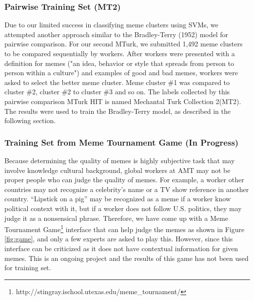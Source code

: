 \documentclass{sig-alternate}
\begin{document}
\subsubsection{Pairwise Training Set (MT2)}
Due to our limited success in classifying meme clusters using SVMs, we attempted another approach similar to the Bradley-Terry (1952) model for pairwise comparison.  For our second MTurk, we submitted 1,492 meme clusters to be compared sequentially by workers. After workers were presented with a definition for memes ("an idea, behavior or style that spreads from person to person within a culture") and examples of good and bad memes, workers were asked to select the better meme cluster. Meme cluster \#1 was compared to cluster \#2, cluster \#2 to cluster \#3 and so on. The labels collected by this pairwise comparison MTurk HIT is named Mechantal Turk Collection 2(MT2). The results were used to train the Bradley-Terry model, as described in the following section. 


\subsubsection{Training Set from Meme Tournament Game (In Progress)}

Because determining the quality of memes is highly subjective task that may involve knowledge cultural background, global workers at AMT may not be proper people who can judge the quality of memes. For example, a worker other countries may not recognize a celebrity's name or a TV show reference in another country. ``Lipstick on a pig'' may be recognized as a meme if a worker know political context with it, but if a worker does not follow U.S. politics, they may judge it as a nonsensical phrase. Therefore, we have come up with a Meme Tournament Game\footnote{http://stingray.ischool.utexas.edu/meme\_tournament/} interface that can help judge the memes as shown in Figure \ref{fig:game}, and only a few experts are asked to play this. However, since this interface can be criticized as it does not have contextual information for given memes. This is an ongoing project and the results of this game has not been used for training set.
\end{document}
